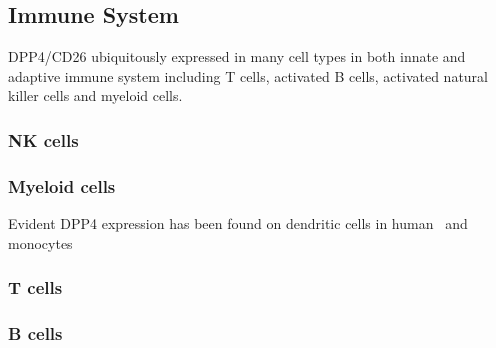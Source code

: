 \subsection{Immune System}
DPP4/CD26 ubiquitously expressed in many cell types in both innate and adaptive immune system including T cells, activated B cells, activated natural killer cells and myeloid cells.~\cite{Abbott1994,Shingu2003,Hong1989,Gutschmidt1981,Dikov2004,Bühling1995,Tanaka1992,Gorrell1991}  

\subsubsection{NK cells}

\subsubsection{Myeloid cells}
Evident DPP4 expression has been found on dendritic cells in human~\cite{Zhong2013,Gliddon2002,Epardaud2004} and monocytes

\subsubsection{T cells}
\subsubsection{B cells}
